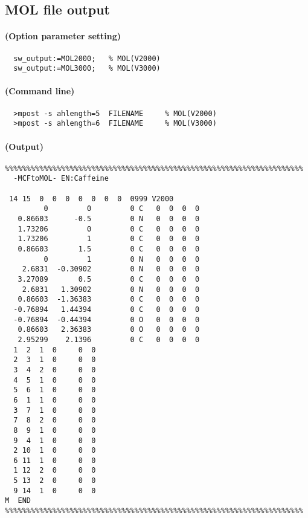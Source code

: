 \documentclass[a4paper]{article}
\begin{document}
\subsection{MOL file output}
\paragraph{(Option parameter setting)}
%
%
%
\begin{verbatim}
  sw_output:=MOL2000;   % MOL(V2000)
  sw_output:=MOL3000;   % MOL(V3000)
\end{verbatim}
\paragraph{(Command line)}
\begin{verbatim}
  >mpost -s ahlength=5  FILENAME     % MOL(V2000)
  >mpost -s ahlength=6  FILENAME     % MOL(V3000)
\end{verbatim}
\paragraph{(Output)}
\begin{verbatim}
%%%%%%%%%%%%%%%%%%%%%%%%%%%%%%%%%%%%%%%%%%%%%%%%%%%%%%%%%%%%%%%%%%%%%
  -MCFtoMOL- EN:Caffeine         

 14 15  0  0  0  0  0  0  0  0999 V2000
         0         0         0 C   0  0  0  0
   0.86603      -0.5         0 N   0  0  0  0
   1.73206         0         0 C   0  0  0  0
   1.73206         1         0 C   0  0  0  0
   0.86603       1.5         0 C   0  0  0  0
         0         1         0 N   0  0  0  0
    2.6831  -0.30902         0 N   0  0  0  0
   3.27089       0.5         0 C   0  0  0  0
    2.6831   1.30902         0 N   0  0  0  0
   0.86603  -1.36383         0 C   0  0  0  0
  -0.76894   1.44394         0 C   0  0  0  0
  -0.76894  -0.44394         0 O   0  0  0  0
   0.86603   2.36383         0 O   0  0  0  0
   2.95299    2.1396         0 C   0  0  0  0
  1  2  1  0     0  0
  2  3  1  0     0  0
  3  4  2  0     0  0
  4  5  1  0     0  0
  5  6  1  0     0  0
  6  1  1  0     0  0
  3  7  1  0     0  0
  7  8  2  0     0  0
  8  9  1  0     0  0
  9  4  1  0     0  0
  2 10  1  0     0  0
  6 11  1  0     0  0
  1 12  2  0     0  0
  5 13  2  0     0  0
  9 14  1  0     0  0
M  END
%%%%%%%%%%%%%%%%%%%%%%%%%%%%%%%%%%%%%%%%%%%%%%%%%%%%%%%%%%%%%%%%%%%%%
\end{verbatim}
\newpage
\end{document}
